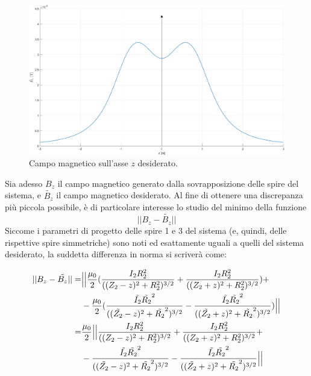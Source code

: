 \documentclass[a4paper, 11pt]{article}
\begin{document}
\begin{figure}[H]
    \centering
    \includegraphics[width=16cm]{assets/figure2}
    \caption{Campo magnetico sull'asse $z$ desiderato.}
\end{figure}
\noindent
Sia adesso $B_{z}$ il campo magnetico generato dalla sovrapposizione delle spire
del sistema, e $\tilde{B_{z}}$ il campo magnetico desiderato. Al fine di
ottenere una discrepanza più piccola possibile, è di particolare interesse lo
studio del minimo della funzione
\[||B_{z}-\tilde{B_{z}}||\] Siccome i parametri di progetto delle spire 1 e 3
del sistema (e, quindi, delle rispettive spire simmetriche) sono noti ed
esattamente uguali a quelli del sistema desiderato, la suddetta differenza in
norma si scriverà come:

\begin{equation}
    \begin{split}
        ||B_{z}-\tilde{B_{z}}||
        =& \Bigl|\Bigl|\frac{\mu_{0}}{2}(\frac{I_{2}R_{2}^{2}}{((Z_{2}-z)^{2}+R_{2}^{2})^{3/2}}+\frac{I_{2}R_{2}^{2}}{((Z_{2}+z)^{2}+R_{2}^{2})^{3/2}})+ \\
         & -\frac{\mu_{0}}{2}(\frac{\tilde{I_{2}}\tilde{R_{2}}^{2}}{((\tilde{Z_{2}}-z)^{2}+\tilde{R_{2}}^{2})^{3/2}}-\frac{\tilde{I_{2}}\tilde{R_{2}}^{2}}{((\tilde{Z_{2}}+z)^{2}+\tilde{R_{2}}^{2})^{3/2}})\Bigr|\Bigr| \\
        =& \frac{\mu_{0}}{2}\Bigl|\Bigl|\frac{I_{2}R_{2}^{2}}{((Z_{2}-z)^{2}+R_{2}^{2})^{3/2}}+\frac{I_{2}R_{2}^{2}}{((Z_{2}+z)^{2}+R_{2}^{2})^{3/2}}+ \\
         & -\frac{\tilde{I_{2}}\tilde{R_{2}}^{2}}{((\tilde{Z_{2}}-z)^{2}+\tilde{R_{2}}^{2})^{3/2}}-\frac{\tilde{I_{2}}\tilde{R_{2}}^{2}}{((\tilde{Z_{2}}+z)^{2}+\tilde{R_{2}}^{2})^{3/2}}\Bigr|\Bigr|
    \end{split} 
\end{equation}
\noindent
\end{document}
